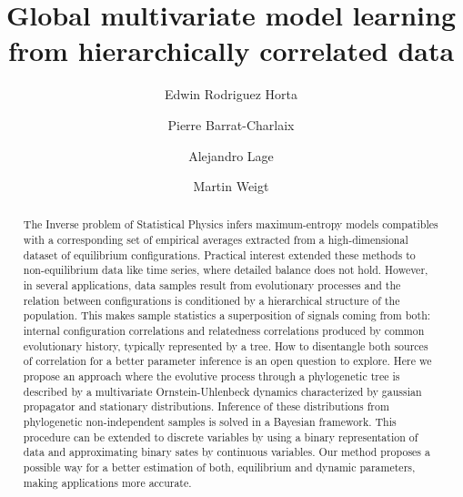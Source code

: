 \documentclass[preprint,amsmath,amssymb,superscriptaddress,showpacs,pre]{revtex4-1}
\begin{document}
\title{Global multivariate model learning from hierarchically correlated data}
\date{}

\author{Edwin Rodriguez Horta} 
%
\author{Pierre Barrat-Charlaix} 
%
\author{Alejandro Lage} 
%
\author{Martin Weigt} 




\begin{abstract}
	The Inverse problem of Statistical Physics infers maximum-entropy  models  compatibles with a corresponding set of empirical averages extracted from a high-dimensional dataset of equilibrium configurations. Practical interest extended these methods to non-equilibrium data  like  time series, where detailed balance does not hold. However, in several applications, data samples  result from evolutionary processes and the relation between configurations is conditioned by a hierarchical structure of the population. This makes sample statistics a superposition of  signals coming from both: internal configuration correlations and relatedness correlations produced by common evolutionary  history, typically represented by a tree. How to disentangle both sources of correlation for a better parameter inference is an open question to explore. Here we propose an approach  where the  evolutive process through a phylogenetic tree is described by  a  multivariate Ornstein-Uhlenbeck dynamics characterized by  gaussian propagator and stationary distributions. Inference of these distributions from  phylogenetic non-independent samples is solved in a Bayesian framework. This procedure can be  extended to discrete variables by using a binary representation of data and approximating  binary sates by continuous variables. Our method proposes a possible way for  a better estimation of both, equilibrium and dynamic parameters, making  applications more accurate. 
\end{abstract}
\end{document}
